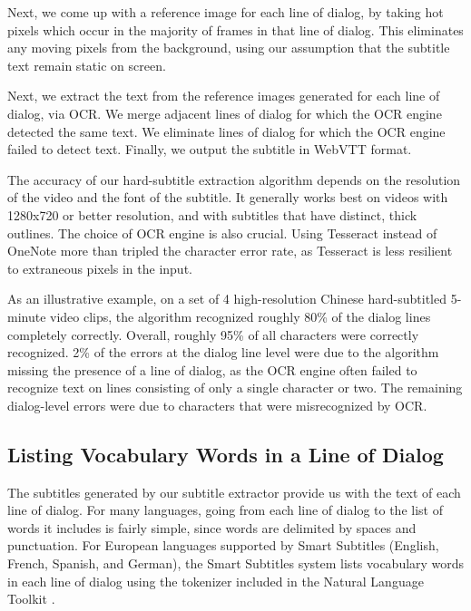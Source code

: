 \documentclass{sigchi}
\begin{document}
Next, we come up with a reference image for each line of dialog, by taking hot pixels which occur in the majority of frames in that line of dialog. This eliminates any moving pixels from the background, using our
assumption that the subtitle text remain static on screen.

Next, we extract the text from the reference images generated for each line of dialog, via OCR. We merge adjacent lines of dialog for which the OCR engine detected the same text. We eliminate lines of dialog for which the OCR engine failed to detect text. Finally, we output the subtitle in WebVTT format.

The accuracy of our hard-subtitle extraction algorithm depends on the resolution of the video and
the font of the subtitle. It generally works best on videos with 1280x720 or better resolution, and with subtitles that have distinct, thick outlines. The choice of OCR engine is also crucial. Using Tesseract instead of OneNote more than tripled the character error rate,
as Tesseract is less resilient to extraneous pixels in the input.

As an illustrative example, on a set of 4 high-resolution Chinese hard-subtitled 5-minute video clips, the algorithm recognized roughly 80\% of the dialog lines completely correctly. Overall, roughly 95\% of all characters were correctly recognized. 2\% of the errors at the dialog line level were due to the algorithm missing the presence of a line of dialog, as the OCR engine often failed to recognize text on lines consisting of only a single character or two. The remaining dialog-level errors were due to characters that were misrecognized by OCR.


\subsection{Listing Vocabulary Words in a Line of Dialog}

The subtitles generated by our subtitle extractor provide us with the text of each line of dialog. For many languages,
going from each line of dialog to the list of words it includes is fairly simple, since words are
delimited by spaces and punctuation. For European languages supported by
Smart Subtitles (English, French, Spanish, and German), the Smart Subtitles system lists
vocabulary words in each line of dialog using the
tokenizer included in the Natural
Language Toolkit \cite{nltk}.
\end{document}
